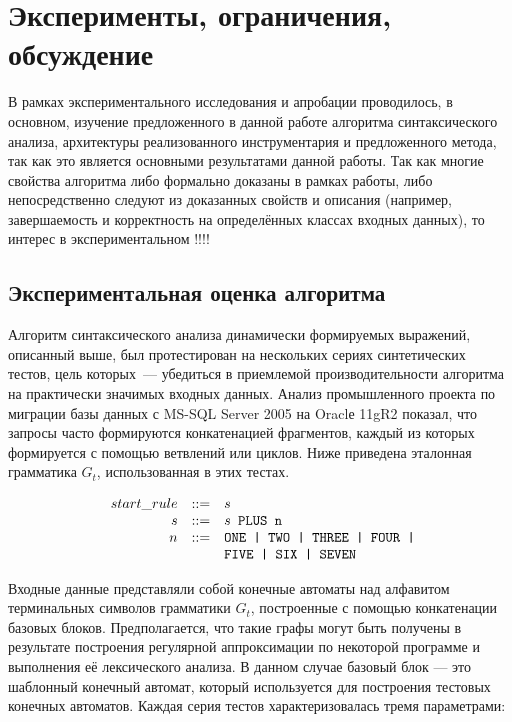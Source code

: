 \chapter{Эксперименты, ограничения, обсуждение} \label{chaptEval}

В рамках экспериментального исследования и апробации проводилось, в основном, изучение предложенного в данной работе алгоритма синтаксического анализа, архитектуры реализованного инструментария и предложенного метода, так как это является основными результатами данной работы. Так как многие свойства алгоритма либо формально доказаны в рамках работы, либо непосредственно следуют из доказанных свойств и описания (например, завершаемость и корректность на определённых классах входных данных), то интерес в экспериментальном !!!!


\section{Экспериментальная оценка алгоритма}\label{SyntTestsEvalDescr}

Алгоритм синтаксического анализа динамически формируемых выражений, описанный выше, был протестирован на нескольких сериях синтетических тестов, цель которых~--- убедиться в приемлемой производительности алгоритма на практически значимых входных данных. Анализ промышленного проекта по миграции базы данных с MS-SQL Server 2005 на Oraclе 11gR2 показал, что запросы часто формируются конкатенацией фрагментов, каждый из которых формируется с помощью ветвлений или циклов. Ниже приведена эталонная грамматика $G_t$, использованная в этих тестах.

$$
\begin{array}{crcl}
& start\_rule &::=& s \\
& s & ::= & s \mbox{\texttt{ PLUS }} \mbox{\texttt{n}}\\
& n & ::= & \mbox{\texttt{ONE | }} \mbox{\texttt{TWO | }} \mbox{\texttt{THREE | }} \mbox{\texttt{FOUR | }} \\
&   &     & \mbox{\texttt{FIVE | }} \mbox{\texttt{SIX | }} \mbox{\texttt{SEVEN}}
\end{array}
$$

Входные данные представляли собой конечные автоматы над алфавитом терминальных символов грамматики $G_t$, построенные с помощью конкатенации базовых блоков. Предполагается, что такие графы могут быть получены в результате построения регулярной аппроксимации по некоторой программе и выполнения её лексического анализа. В данном случае базовый блок --- это шаблонный конечный автомат, который используется для построения тестовых конечных автоматов. Каждая серия тестов характеризовалась тремя параметрами: 

